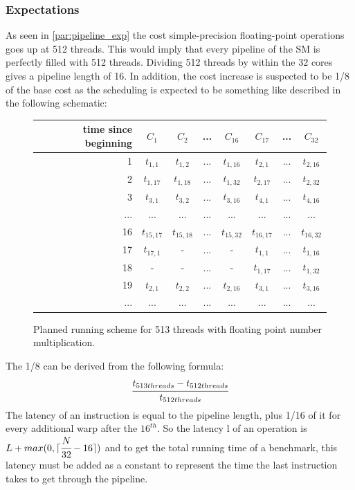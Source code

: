 \documentclass{article}
\DeclarePairedDelimiter\ceil{\lceil}{\rceil}
\begin{document}
	\subsubsection{Expectations}
	As seen in \ref{par:pipeline_exp} the cost simple-precision floating-point
    operations goes up at 512 threads. This would imply that every pipeline of
    the SM is perfectly filled with 512 threads. Dividing 512 threads by within
    the 32 cores gives a pipeline length of 16. In addition, the cost increase
    is suspected to be 1/8 of the base cost as the scheduling is expected to be
    something like described in the following schematic:
    
    \begin{figure}[h]
      \centering
       \begin{tabular}{ | r || c | c | c | c || c | c | c | }
    	    \hline
    	    time since beginning & $C_1$ & $C_2$ & ... & $C_{16}$ & $C_{17}$ & ... & $C_{32}$ \\ \hline  \hline
    	   1 & $t_{1,1}$ & $t_{1,2}$ & ... & $t_{1,16}$ & $t_{2, 1}$ & ... & $t_{2, 16}$ \\ \hline 
    	   2 & $t_{1,17}$ & $t_{1,18}$ & ... & $t_{1,32}$ & $t_{2, 17}$ & ... & $t_{2, 32}$ \\ \hline
    	   3 & $t_{3,1}$ & $t_{3,2}$ & ... & $t_{3,16}$ & $t_{4, 1}$ & ... & $t_{4, 16}$ \\ \hline
    	   ... & ... & ... & ... & ... & ... & ... & ... \\ \hline
    	   16 & $t_{15,17}$ & $t_{15,18}$ & ... & $t_{15,32}$ & $t_{16,17}$ & ... & $t_{16, 32}$ \\ \hline
    	   17 & $t_{17,1}$ & - & ... & - & $t_{1,1}$ & ... & $t_{1, 16}$ \\ \hline
    	   18 & - & - & ... & - & $t_{1,17}$ & ... & $t_{1, 32}$ \\ \hline
    	   19 & $t_{2,1}$ & $t_{2,2}$ & ... & $t_{2,16}$ & $t_{3,1}$ & ... & $t_{3,16}$ \\ \hline
    	   ... & ... & ... & ... & ... & ... & ... & ... \\ \hline
  	\end{tabular}
  	\captionsetup{justification=centering}
  	\caption{Planned running scheme for 513 threads with floating point number multiplication.}
  	\label{fig:fp_prediction_513}
   \end{figure}

    The 1/8 can be derived from the following formula:
    \[ \cfrac{t_{513threads} - t_{512threads}}{t_{512threads}} \]
    The latency of an instruction is equal to the pipeline length, plus 1/16 of
    it for every additional warp after the $16^{th}$. So the latency l of an 
    operation is $L + max(0, \ceil{\cfrac{N}{32} -16})$ and to get the total
    running time of a benchmark, this latency must be added as a constant to
    represent the time the last instruction takes to get through the pipeline.
\end{document}
